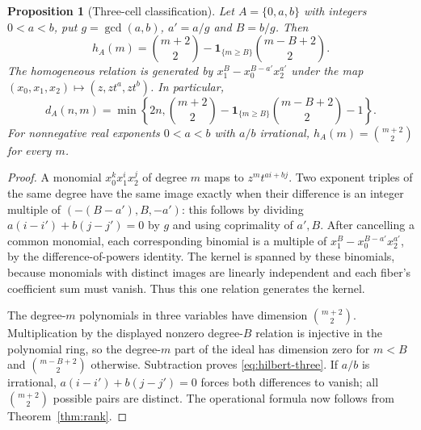 \documentclass[11pt]{amsart}
\newtheorem{proposition}[theorem]{Proposition}
\theoremstyle{definition}\newtheorem{definition}[theorem]{Definition}
\theoremstyle{remark}\newtheorem{remark}[theorem]{Remark}
\newcommand{\one}{\mathbf 1}\newcommand{\dd}{\,\mathrm d}
\begin{document}
\begin{proposition}[Three-cell classification]\label{prop:three}
Let $A=\{0,a,b\}$ with integers $0<a<b$, put
$g=\gcd(a,b)$, $a'=a/g$ and $B=b/g$. Then
\begin{equation}\label{eq:hilbert-three}
 h_A(m)=\binom{m+2}{2}
       -\one_{\{m\ge B\}}\binom{m-B+2}{2}.
\end{equation}
The homogeneous relation is generated by
$x_1^B-x_0^{B-a'}x_2^{a'}$ under the map
$(x_0,x_1,x_2)\mapsto(z,zt^a,zt^b)$. In particular,
\[
 d_A(n,m)=\min\left\{2n,
 \binom{m+2}{2}-\one_{\{m\ge B\}}\binom{m-B+2}{2}-1\right\}.
\]
For nonnegative real exponents $0<a<b$ with $a/b$ irrational,
$h_A(m)=\binom{m+2}{2}$ for every $m$.
\end{proposition}
\begin{proof}
A monomial $x_0^kx_1^ix_2^j$ of degree $m$ maps to $z^m t^{ai+bj}$.
Two exponent triples of the same degree have the same image exactly when
their difference is an integer multiple of
$(-(B-a'),B,-a')$: this follows by dividing
$a(i-i')+b(j-j')=0$ by $g$ and using coprimality of $a',B$.
After cancelling a common monomial, each corresponding binomial is a
multiple of $x_1^B-x_0^{B-a'}x_2^{a'}$, by the difference-of-powers
identity. The kernel is spanned by these binomials, because monomials
with distinct images are linearly independent and each fiber's coefficient
sum must vanish. Thus this one relation generates the kernel.

The degree-$m$ polynomials in three variables have dimension
$\binom{m+2}{2}$. Multiplication by the displayed nonzero degree-$B$
relation is injective in the polynomial ring, so the degree-$m$ part of
the ideal has dimension zero for $m<B$ and
$\binom{m-B+2}{2}$ otherwise. Subtraction proves
\eqref{eq:hilbert-three}. If $a/b$ is irrational,
$a(i-i')+b(j-j')=0$ forces both differences to vanish; all
$\binom{m+2}{2}$ possible pairs are distinct. The operational formula
now follows from Theorem~\ref{thm:rank}.
\end{proof}
\end{document}
